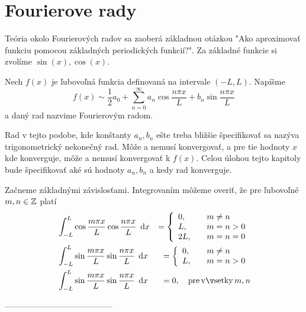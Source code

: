 \section{Fourierove rady}

Teória okolo Fourierových radov sa zaoberá základnou otázkou "Ako
aproximovať funkciu pomocou základných periodických funkcií?".
Za základné funkcie si zvolíme $\sin(x), \cos(x)$.

\begin{definicia} Nech $f(x)$ je ľubovoľná funkcia definovaná na
intervale $(-L,L)$. Napíšme
    \begin{equation}
        f(x) \sim \frac{1}{2} a_0 + \sum_{n=0}^{\infty} a_n
        \cos\frac{n \pi x}{L} + b_n \sin\frac{n \pi x}{L}
    \end{equation}
a daný rad nazvime Fourierovým radom.
\end{definicia}
Rad v tejto podobe, kde konštanty $a_n, b_n$ ešte treba bližšie
špecifikovať sa nazýva trigonometrický nekonečný rad. Môže a nemusí
konvergovať, a pre tie hodnoty $x$ kde konverguje, môže a nemusí
konvergovať k $f(x)$. Celou úlohou tejto kapitoly bude špecifikovať
aké sú hodnoty $a_n, b_n$ a kedy rad konverguje.

Začneme základnými závislosťami. Integrovaním môžeme overiť, že pre
ľubovoľné $m,n \in \mathbb{Z}$ platí
\begin{eqnarray}
    &\displaystyle \int_{-L}^{L} \cos \frac{m \pi x}{L} 
     \cos\frac{n \pi x}{L}\, \dd x &= 
     \left\{
        \begin{array}{l l}
            0,& \quad m\not=n \\
            L,& \quad m=n>0 \\
            2L,& \quad m=n=0
        \end{array}
     \right. \nonumber\\
    &\displaystyle \int_{-L}^{L} \sin \frac{m \pi x}{L} 
     \sin\frac{n \pi x}{L}\, \dd x &= 
     \left\{
        \begin{array}{l l}
            0,& \quad m\not=n \\
            L,& \quad m=n > 0
        \end{array}    
     \right. \nonumber\\
    &\displaystyle \int_{-L}^{L} \sin \frac{m \pi x}{L}
     \sin \frac{n \pi x}{L}\, \dd x &= 0,
        \quad {\rm pre\, všetky\,} m,n
        \label{eq:basic_orthogonality}
\end{eqnarray}

---------------------------------------

